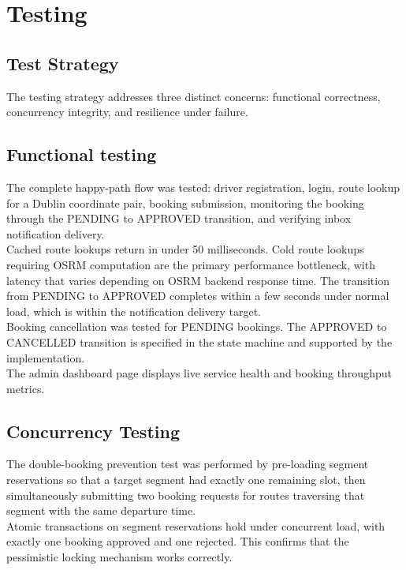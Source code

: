\documentclass{article}
\begin{document}
\section{Testing}
\subsection{Test Strategy}
The testing strategy addresses three distinct concerns: functional correctness, concurrency integrity, and resilience under failure.

\subsection{Functional testing}
The complete happy-path flow was tested: driver registration, login, route lookup for a Dublin coordinate pair, booking submission, monitoring the booking through the PENDING to APPROVED transition, and verifying inbox notification delivery.\\
Cached route lookups return in under 50 milliseconds. Cold route lookups requiring OSRM computation are the primary performance bottleneck, with latency that varies depending on OSRM backend response time. The transition from PENDING to APPROVED completes within a few seconds under normal load, which is within the notification delivery target.\\
Booking cancellation was tested for PENDING bookings. The APPROVED to CANCELLED transition is specified in the state machine and supported by the implementation.\\
The admin dashboard page displays live service health and booking throughput metrics.

\subsection{Concurrency Testing}
The double-booking prevention test was performed by pre-loading segment reservations so that a target segment had exactly one remaining slot, then simultaneously submitting two booking requests for routes traversing that segment with the same departure time.\\
Atomic transactions on segment reservations hold under concurrent load, with exactly one booking approved and one rejected. This confirms that the pessimistic locking mechanism works correctly.
\\
\end{document}
